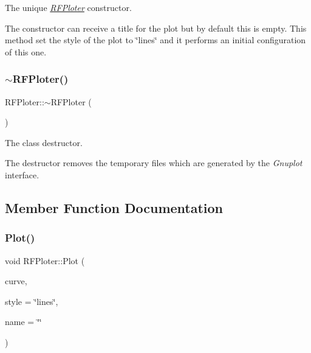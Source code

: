 The unique {\itshape \hyperlink{classRFPloter}{R\+F\+Ploter}} constructor. 

The constructor can receive a title for the plot but by default this is empty. This method set the style of the plot to \char`\"{}lines\char`\"{} and it performs an initial configuration of this one. \mbox{\label{classRFPloter_a773b630723c5fbd6f05173a52de7f35e}} 
\subsubsection{\texorpdfstring{$\sim$\+R\+F\+Ploter()}{~RFPloter()}}
{\footnotesize\ttfamily R\+F\+Ploter\+::$\sim$\+R\+F\+Ploter (\begin{DoxyParamCaption}{ }\end{DoxyParamCaption})\hspace{0.3cm}{\ttfamily [inline]}}



The class destructor. 

The destructor removes the temporary files which are generated by the {\itshape Gnuplot} interface. 

\subsection{Member Function Documentation}
\mbox{\label{classRFPloter_a8a1c40470c52e8e4522dd0a350ea1aca}} 
\subsubsection{\texorpdfstring{Plot()}{Plot()}}
{\footnotesize\ttfamily void R\+F\+Ploter\+::\+Plot (\begin{DoxyParamCaption}\item[{const \hyperlink{structFreqValues}{Freq\+Values} \&}]{curve,  }\item[{const std\+::string \&}]{style = {\ttfamily \char`\"{}lines\char`\"{}},  }\item[{const std\+::string \&}]{name = {\ttfamily \char`\"{}\char`\"{}} }\end{DoxyParamCaption})\hspace{0.3cm}{\ttfamily [inline]}}



